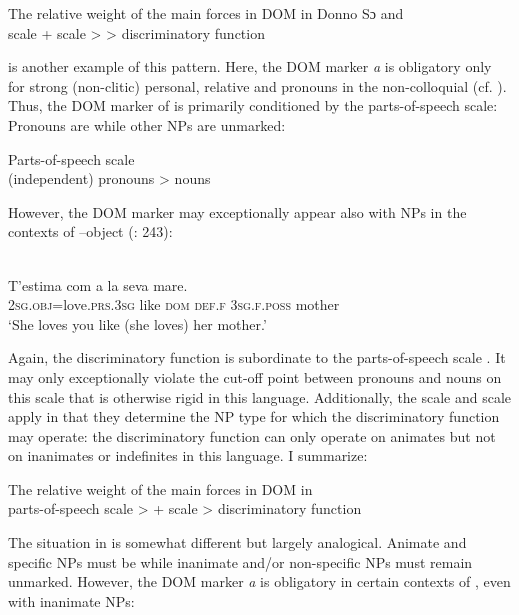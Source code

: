 \documentclass[output=paper]{langsci/langscibook}
\begin{document}
\ea\label{ex:serzant:12}
The relative weight of the main forces in DOM in Donno Sɔ and \\
 scale +  scale >  > discriminatory function\\
\z

 is another example of this pattern. Here, the DOM marker \textit{a} is obligatory only for strong (non-clitic) personal, relative and  pronouns in the non-colloquial  (cf. \citealt{Escandell-Vidal2009}). Thus, the DOM marker of  is primarily conditioned by the parts-of-speech scale: Pronouns are  while other NPs are unmarked: 

\ea\label{ex:serzant:13}
Parts-of-speech scale\\
(independent) pronouns > nouns\\
\z

However, the DOM marker may exceptionally appear also with   NPs in the contexts of –object  (\citealt{WheelerEtAl1999}: 243):

\ea\label{ex:serzant:14}
\\
\gll T’estima     com a     la   seva     mare.\\
     \textsc{2sg.obj}=love.\textsc{prs.3sg} like \textsc{dom}   \textsc{def.f}   \textsc{3sg.f.poss}   mother\\
\glt ‘She loves you like (she loves) her mother.’
\z

Again, the discriminatory function is subordinate to the parts-of-speech scale . It may only exceptionally violate the cut-off point between pronouns and nouns on this scale that is otherwise rigid in this language. Additionally, the  scale  and  scale  apply in that they determine the NP type for which the discriminatory function may operate: the discriminatory function can only operate on  animates but not on inanimates or indefinites in this language. I summarize:

\ea\label{ex:serzant:15}
The relative weight of the main forces in DOM in \\
parts-of-speech scale >  +  scale > discriminatory function
\z

The situation in  is somewhat different but largely analogical. Animate and specific NPs must be  while inanimate and/or non-specific NPs must remain unmarked. However, the DOM marker \textit{a} is obligatory in certain contexts of , even with inanimate NPs:
\end{document}
